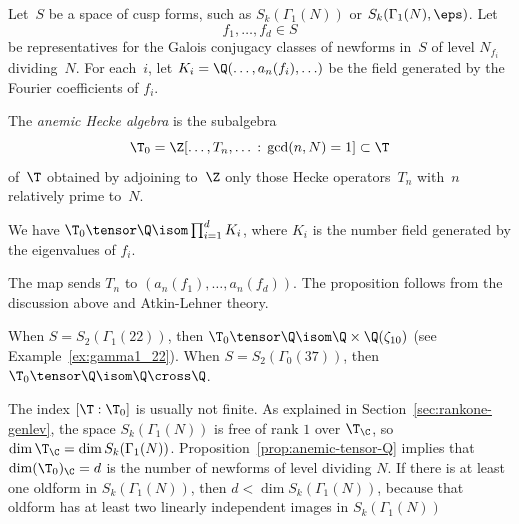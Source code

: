 \documentclass{report}
\begin{document}

Let~$S$ be a space of cusp forms, such as $S_k(\Gamma_1(N))$ or
$S_k(\Gamma_1(N),\eps)$. Let $$f_1,\ldots, f_d\in S$$ be
representatives for the Galois conjugacy classes of newforms
in~$S$ of level $N_{f_i}$ dividing~$N$.  For each~$i$, let
$K_i=\Q(\ldots, a_n(f_i),\ldots)$ be the field generated by the
Fourier coefficients of $f_i$.
\begin{definition}
The {\em anemic Hecke algebra} is the subalgebra
$$\T_0=\Z[\ldots,T_n,\ldots\,:\,\gcd(n,N)=1]\subset\T$$
of~$\T$ obtained by adjoining to~$\Z$ only those
Hecke operators~$T_n$ with~$n$ relatively prime to~$N$.
\end{definition}
\begin{proposition}\label{prop:anemic-tensor-Q}
  We have $\T_0\tensor\Q \isom \prod_{i=1}^d K_i$, where $K_i$ is the
  number field generated by the eigenvalues of $f_i$.
\end{proposition}
The map sends $T_n$ to $(a_n(f_1),\ldots, a_n(f_d))$.  The proposition
follows from the discussion above and Atkin-Lehner theory.

\begin{example}
When $S=S_2(\Gamma_1(22))$, then $\T_0\tensor\Q\isom
\Q\times \Q(\zeta_{10})$ (see Example~\ref{ex:gamma1_22}).
When $S=S_2(\Gamma_0(37))$, then $\T_0\tensor\Q\isom\Q\cross\Q$.
\end{example}


\begin{remark}
The index $[\T:\T_0]$ is usually not finite.  As explained in
Section~\ref{sec:rankone-genlev}, the space $S_k(\Gamma_1(N))$ is free
of rank $1$ over $\T_{\C}$, so $\dim \T_{\C} = \dim S_k(\Gamma_1(N))$.
Proposition~\ref{prop:anemic-tensor-Q} implies that $\dim (\T_0)_{\C}
= d$ is the number of newforms of level dividing $N$.  If there is at
least one oldform in $S_k(\Gamma_1(N))$, then $d < \dim
S_k(\Gamma_1(N))$, because that oldform has at least two linearly
independent images in $S_k(\Gamma_1(N))$
\end{remark}
\end{document}
